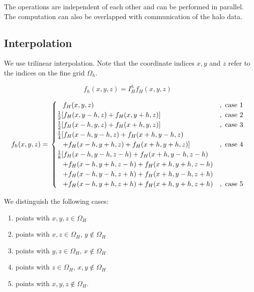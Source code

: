 \documentclass[11pt, oneside, a4paper]{article}
\begin{document}
The operations are independent of each other and can be performed in parallel. The computation can also be overlapped with communication of the halo data.

\subsection{Interpolation}

We use trilinear interpolation. Note that the coordinate indices $x,y$ and $z$ refer to the indices on the fine grid $\Omega_h$.

\begin{equation*}
f_h(x,y,z) = I_H^h f_H(x,y,z)
\end{equation*}

\begin{equation*}
f_h(x,y,z) =\\
\begin{cases}
\;\;\;f_H(x,y,z)& , \mbox{ case } 1\\
\frac{1}{2} [f_H(x,y-h,z)+f_H(x,y+h,z)] &,  \mbox{ case } 2\\
\frac{1}{2} [f_H(x-h,y,z)+f_H(x+h,y,z)] &,  \mbox{ case } 3\\
\frac{1}{4} [f_H(x-h,y-h,z)+f_H(x+h,y-h,z) \\
\;\;\;+f_H(x-h,y+h,z)+f_H(x+h,y+h,z)] &,  \mbox{ case } 4\\
\frac{1}{8} [f_H(x-h,y-h,z-h)+f_H(x+h,y-h,z-h)\\
\;\;\;+f_H(x-h,y+h,z-h)+f_H(x+h,y+h,z-h)\\
\;\;\;+f_H(x-h,y-h,z+h)+f_H(x+h,y-h,z+h)\\
\;\;\;+f_H(x-h,y+h,z+h)+f_H(x+h,y+h,z+h) &, \mbox{ case } 5
\end{cases}
\vspace*{0.5cm}
\end{equation*}

We distinguish the following cases:

\begin{enumerate}
\item points with $x,y,z\in\Omega_H$ 
\item points with $x,z\in \Omega_H$, $y\notin \Omega_H$  
\item points with $y,z\in \Omega_H$, $x\notin \Omega_H$
\item points with $z\in \Omega_H$, $x,y\notin \Omega_H$ 
\item points with $x,y,z\notin \Omega_H$. 
\end{enumerate}
\end{document}
